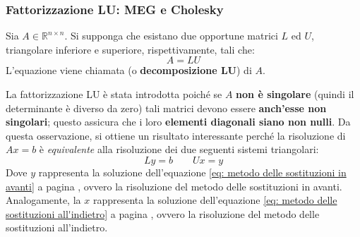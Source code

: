 \newpage

\subsubsection{Fattorizzazione LU: MEG e Cholesky}

Sia $A \in \mathbb{R}^{n \times n}$. Si supponga che esistano due opportune matrici $L$ ed $U$, triangolare inferiore e superiore, rispettivamente, tali che:
\begin{equation}\label{eq: fattorizzazione LU}
    A = LU
\end{equation}
L'equazione viene chiamata  (o \textbf{decomposizione LU}) di $A$. 

\highspace
La fattorizzazione LU è stata introdotta poiché se $A$ \textbf{non è singolare} (quindi il determinante è diverso da zero) tali matrici devono essere \textbf{anch'esse non singolari}; questo assicura che i loro \textbf{elementi diagonali siano non nulli}. Da questa osservazione, si ottiene un risultato interessante perché la risoluzione di $Ax = b$ è \emph{equivalente} alla risoluzione dei due seguenti sistemi triangolari:
\begin{equation}
    Ly = b \hspace{2em} Ux = y
\end{equation}
Dove $y$ rappresenta la soluzione dell'equazione \ref{eq: metodo delle sostituzioni in avanti} a pagina \pageref{eq: metodo delle sostituzioni in avanti}, ovvero la risoluzione del metodo delle sostituzioni in avanti. Analogamente, la $x$ rappresenta la soluzione dell'equazione \ref{eq: metodo delle sostituzioni all'indietro} a pagina \pageref{eq: metodo delle sostituzioni all'indietro}, ovvero la risoluzione del metodo delle sostituzioni all'indietro.


